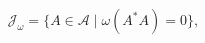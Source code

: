 \begin{equation}
    \label{eq:Jomega}
    \mathcal{J}_\omega 
    = \{A \in \mathcal{A} \; | \; \omega(A^*A) = 0\},
\end{equation}

